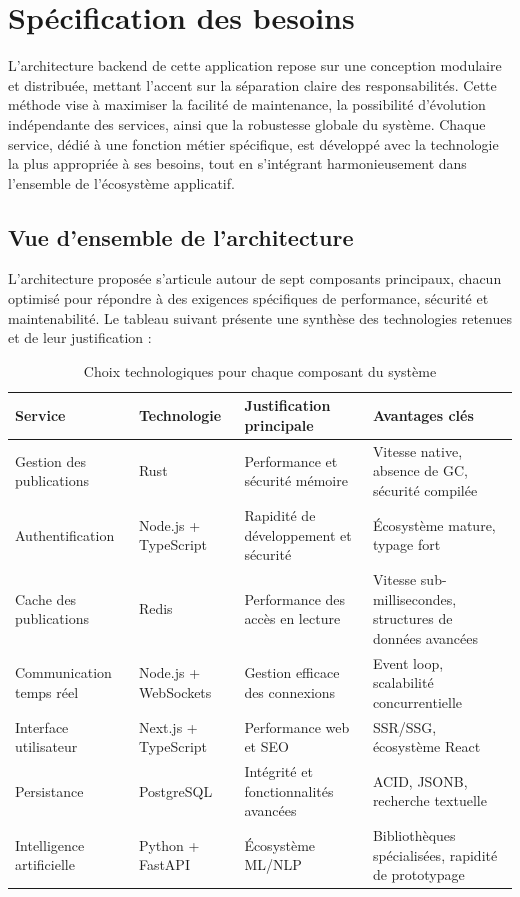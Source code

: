 \documentclass[12pt]{rapportPfe}
\begin{document}
\chapter{Spécification des besoins}

L’architecture backend de cette application repose sur une conception modulaire et distribuée, mettant l’accent sur la séparation claire des responsabilités. Cette méthode vise à maximiser la facilité de maintenance, la possibilité d’évolution indépendante des services, ainsi que la robustesse globale du système. Chaque service, dédié à une fonction métier spécifique, est développé avec la technologie la plus appropriée à ses besoins, tout en s’intégrant harmonieusement dans l’ensemble de l’écosystème applicatif.

\section{Vue d'ensemble de l'architecture}
L'architecture proposée s'articule autour de sept composants principaux, chacun optimisé pour répondre à des exigences spécifiques de performance, sécurité et maintenabilité. Le tableau suivant présente une synthèse des technologies retenues et de leur justification :

\begin{table}[ht]
\centering
\begin{tabular}{| >{\raggedright\arraybackslash}p{3cm} 
                | >{\raggedright\arraybackslash}p{2.5cm} 
                | >{\raggedright\arraybackslash}p{4cm} 
                | >{\raggedright\arraybackslash}p{6.5cm} |}

\hline
\textbf{Service} & \textbf{Technologie} & \textbf{Justification principale} & \textbf{Avantages clés} \\
\hline
Gestion des publications & Rust & Performance et sécurité mémoire & Vitesse native, absence de GC, sécurité compilée \\
\hline
Authentification & Node.js + TypeScript & Rapidité de développement et sécurité & Écosystème mature, typage fort \\
\hline
Cache des publications & Redis & Performance des accès en lecture & Vitesse sub-millisecondes, structures de données avancées \\
\hline
Communication temps réel & Node.js + WebSockets & Gestion efficace des connexions & Event loop, scalabilité concurrentielle \\
\hline
Interface utilisateur & Next.js + TypeScript & Performance web et SEO & SSR/SSG, écosystème React \\
\hline
Persistance & PostgreSQL & Intégrité et fonctionnalités avancées & ACID, JSONB, recherche textuelle \\
\hline
Intelligence artificielle & Python + FastAPI & Écosystème ML/NLP & Bibliothèques spécialisées, rapidité de prototypage \\
\hline
\end{tabular}
\caption{Choix technologiques pour chaque composant du système}
\label{tab:choix-tech}
\end{table}
\end{document}
